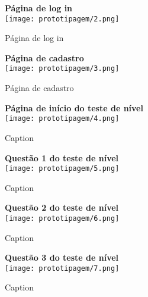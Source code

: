 \documentclass[
	article,			%
	12pt,				%
	oneside,			%
	a4paper,			%
	english,			%
	brazil,				%
	sumario=tradicional
	]{abntex2}
\begin{document}
\begin{apendicesenv}
\begin{figure}[!htbp]
    \begin{minipage}{1\linewidth}
        \centering
        {\textbf{Página de log in}}\\[2mm]
        \texttt{[image: prototipagem/2.png]}
        \caption{Página de log in}
        \label{fig:prototipagem2}
    \end{minipage}


   

    \vspace{3mm} %

    \begin{minipage}{1\linewidth}
        \centering
        {\textbf{Página de cadastro}}\\[2mm]
        \texttt{[image: prototipagem/3.png]}
        \caption{Página de cadastro}
        \label{fig:prototipagem3}
    \end{minipage}

\end{figure}


\begin{figure}[!htbp]
    \centering
    \begin{minipage}{1\linewidth}
        \centering
        {\textbf{Página de início do teste de nível}}\\[2mm]
        \texttt{[image: prototipagem/4.png]}
        \caption{Caption}
        \label{fig:prototipagem4}
    \end{minipage}
    \hfill
    \begin{minipage}{1\linewidth}
        \centering
        {\textbf{Questão 1 do teste de nível}}\\[2mm]
        \texttt{[image: prototipagem/5.png]}
        \caption{Caption}
        \label{fig:prototipagem5}
    \end{minipage}
\end{figure}

\begin{figure}[!htbp]
    \centering
    \begin{minipage}{1\linewidth}
        \centering
        {\textbf{Questão 2 do teste de nível}}\\[2mm]
        \texttt{[image: prototipagem/6.png]}
        \caption{Caption}
        \label{fig:prototipagem6}
    \end{minipage}
    \hfill
    \begin{minipage}{1\linewidth}
        \centering
        {\textbf{Questão 3 do teste de nível}}\\[2mm]
        \texttt{[image: prototipagem/7.png]}
        \caption{Caption}
        \label{fig:prototipagem7}
    \end{minipage}
\end{figure}


\end{apendicesenv}
\end{document}

